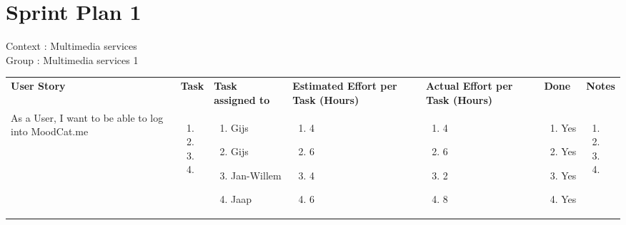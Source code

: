 \documentclass[11pt,a4paper,landscape]{article}
\begin{document}
\section*{Sprint Plan 1}
Context : Multimedia services\\
Group : Multimedia services 1\\



\begin{table}[h]
\begin{tabular}{|p{5cm}|p{1.0cm}|p{2.5cm}|p{1.8cm}|p{1.8cm}|p{1.0cm}|p{12cm}}
\textbf{User Story} & \textbf{Task} & \textbf{Task assigned to} & \textbf{Estimated Effort per Task (Hours)} & \textbf{Actual Effort per Task (Hours)} & \textbf{Done} & \textbf{Notes}\\
As a User, I want to be able to log into MoodCat.me & \begin{enumerate}[leftmargin=0.3cm,itemindent=0.1cm]
\item 
\item
\item 
\item 
\end{enumerate}

& 
\begin{enumerate}[leftmargin=0.1cm,itemindent=0.1cm]
\item[] Gijs 
\item[] Gijs 
\item[] Jan-Willem 
\item[] Jaap  
\end{enumerate}

& 
\begin{enumerate}[leftmargin=0.1cm,itemindent=0.1cm]
\item[] 4 
\item[] 6 
\item[] 4 
\item[] 6 
\end{enumerate}
&
\begin{enumerate}[leftmargin=0.1cm,itemindent=0.1cm]
\item[] 4 
\item[] 6 
\item[] 2 
\item[] 8 
\end{enumerate}
&
\begin{enumerate}[leftmargin=0.1cm,itemindent=0.1cm]
\item[] Yes
\item[] Yes
\item[] Yes
\item[] Yes
\end{enumerate}
&
\begin{enumerate}[leftmargin=0.3cm,itemindent=0.1cm]
\item[]
\item[]
\item[]
\item[]
\end{enumerate}
 \\



\end{tabular}
\end{table}
\end{document}
